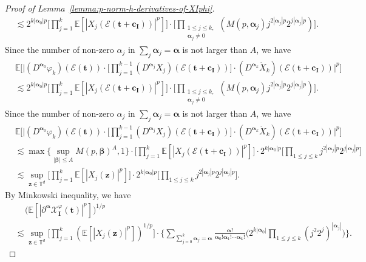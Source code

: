 \documentclass[12pt]{amsart}
\theoremstyle{definition}
\theoremstyle{remark}
\newcommand{\bt}{\boldsymbol{t}}
\newcommand{\bz}{\boldsymbol{z}}
\newcommand{\E}{\mathbb{E}}
\newcommand{\T}{\mathbb{T}}
\numberwithin{equation}{section}
\begin{document}
\begin{proof}[Proof of Lemma~\ref{lemma:p-norm-h-derivatives-of-XIphi}]
\begin{align*}
&\lesssim 2^{k|\boldsymbol{\alpha}_0|p}\bigg[\prod_{j=1}^k \E[|X_j(\mathcal{E}(\bt+\boldsymbol{c_I}))|^p]\bigg]\cdot\bigg[\prod_{\substack{1\le j\le k,\\\boldsymbol{\alpha}_j\ne 0}}(M(p,\boldsymbol{\alpha}_j)j^{2|\boldsymbol{\alpha}_j|p}2^{j|\boldsymbol{\alpha}_j|p})\bigg].
\end{align*}
Since the number of non-zero $\alpha_j$ in $\sum_j \boldsymbol{\alpha}_j=\boldsymbol{\alpha}$ is not larger than $A$, we have
\begin{align*}
&\E\bigg[\bigg|(D^{\boldsymbol{\alpha}_0} \varphi_k)(\mathcal{E}(\bt))\cdot \bigg[\prod_{j=1}^{k-1} (D^{\boldsymbol{\alpha}_j}X_j)(\mathcal{E}(\bt+\boldsymbol{c_I}))\bigg]\cdot (D^{\boldsymbol{\alpha}_k}\mathring{X}_k)(\mathcal{E}(\bt+\boldsymbol{c_I}))\bigg|^p\bigg]\\
&\lesssim 2^{k|\boldsymbol{\alpha}_0|p}\bigg[\prod_{j=1}^k \E[|X_j(\mathcal{E}(\bt+\boldsymbol{c_I}))|^p]\bigg]\cdot\bigg[\prod_{\substack{1\le j\le k,\\\boldsymbol{\alpha}_j\ne 0}}(M(p,\boldsymbol{\alpha}_j)j^{2|\boldsymbol{\alpha}_j|p}2^{j|\boldsymbol{\alpha}_j|p})\bigg].
\end{align*}
Since the number of non-zero $\alpha_j$ in $\sum_j \boldsymbol{\alpha}_j=\boldsymbol{\alpha}$ is not larger than $A$, we have
\begin{align*}
&\E\bigg[\bigg|(D^{\boldsymbol{\alpha}_0} \varphi_k)(\mathcal{E}(\bt))\cdot \bigg[\prod_{j=1}^{k-1} (D^{\boldsymbol{\alpha}_j}X_j)(\mathcal{E}(\bt+\boldsymbol{c_I}))\bigg]\cdot (D^{\boldsymbol{\alpha}_k}\mathring{X}_k)(\mathcal{E}(\bt+\boldsymbol{c_I}))\bigg|^p\bigg]\\
&\lesssim \max\Big\{\sup_{|\boldsymbol{\beta}|\le A}M(p,\boldsymbol{\beta})^A,1\Big\} \cdot \bigg[\prod_{j=1}^k \E[|X_j(\mathcal{E}(\bt+\boldsymbol{c_I}))|^p]\bigg]\cdot 2^{k|\boldsymbol{\alpha}_0|p}\bigg[ \prod_{1\le j\le k} j^{2|\boldsymbol{\alpha}_j|p}2^{j|\boldsymbol{\alpha}_j|p}\bigg]\\
&\lesssim \sup_{\bz\in \T^d}\bigg[\prod_{j=1}^k \E[|X_j(\bz)|^p]\bigg]\cdot 2^{k|\boldsymbol{\alpha}_0|p}\bigg[\prod_{1\le j\le k} j^{2|\boldsymbol{\alpha}_j|p}2^{j|\boldsymbol{\alpha}_j|p}\bigg].
\end{align*}
By Minkowski inequality, we have
\begin{align*}
&\quad \,\big(\E[|\partial^{\boldsymbol{\alpha}}\mathcal{X}_{\boldsymbol{I}}^\varphi(\bt)|^p]\big)^{1/p}\\
&\lesssim  \sup_{\bz\in \T^d}\bigg[\prod_{j=1}^k (\E[|X_j(\bz)|^p])^{1/p}\bigg]\cdot \bigg\{\sum_{\sum_{j=0}^k \boldsymbol{\alpha}_j=\boldsymbol{\alpha}}\frac{\boldsymbol{\alpha}!}{\boldsymbol{\alpha}_0!\boldsymbol{\alpha}_1!\cdots \boldsymbol{\alpha}_k!} \bigg(2^{k|\boldsymbol{\alpha}_0|}\prod_{1\le j\le k} (j^2 2^j)^{|\boldsymbol{\alpha}_j|}\bigg)\bigg\}.

\end{align*}
\end{proof}
\end{document}
